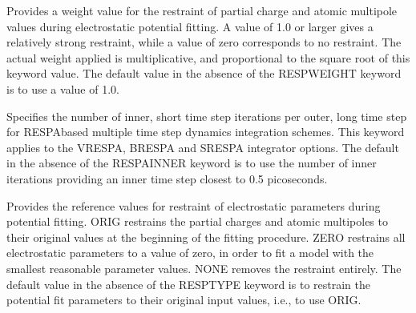 \documentclass[letterpaper,11pt,english]{sphinxmanual}
\begin{document}
\ignorespaces {}\label{\detokenize{text/keywords:key-resp-weight}}\begin{description}
\sphinxAtStartPar
Provides a weight value for the restraint of partial charge and atomic multipole values during electrostatic potential fitting. A value of 1.0 or larger gives a relatively strong restraint, while a value of zero corresponds to no restraint. The actual weight applied is multiplicative, and proportional to the square root of this keyword value. The default value in the absence of the RESP\sphinxhyphen{}WEIGHT keyword is to use a value of 1.0.

\end{description}

\ignorespaces {}\label{\detokenize{text/keywords:key-respa-inner}}\begin{description}
\sphinxAtStartPar
Specifies the number of inner, short time step iterations per outer, long time step for RESPA\sphinxhyphen{}based multiple time step dynamics integration schemes. This keyword applies to the VRESPA, BRESPA and SRESPA integrator options. The default in the absence of the RESPA\sphinxhyphen{}INNER keyword is to use the number of inner iterations providing an inner time step closest to 0.5 picoseconds.

\end{description}

\ignorespaces {}\label{\detokenize{text/keywords:key-resptype}}\begin{description}
\sphinxAtStartPar
Provides the reference values for restraint of electrostatic parameters during potential fitting. ORIG restrains the partial charges and atomic multipoles to their original values at the beginning of the fitting procedure. ZERO restrains all electrostatic parameters to a value of zero, in order to fit a model with the smallest reasonable parameter values. NONE removes the restraint entirely. The default value in the absence of the RESPTYPE keyword is to restrain the potential fit parameters to their original input values, i.e., to use ORIG.

\end{description}
\end{document}
